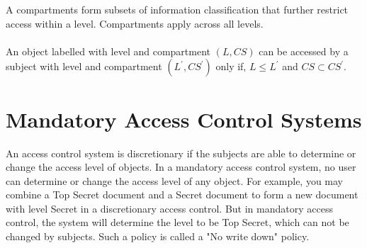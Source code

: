\documentclass[11pt]{article} %
\begin{document}
A compartments form subsets of information classification that further restrict access
within a level. Compartments apply across all levels.\\
\\
An object labelled with level and compartment $(L, CS)$ can be accessed by a subject
with level and compartment $(L^{\prime}, CS^{\prime})$ only if,  $L \leq L^{\prime}$ and
$CS \subset CS^{\prime}$.

\section{Mandatory Access Control Systems}
An access control system is discretionary if the subjects are able to determine or change
the access level of objects. In a mandatory access control system, no user can determine
or change the access level of any object. For example, you may combine a Top Secret document
and a Secret document to form a new document with level Secret in a discretionary access
control. But in mandatory access control, the system will determine the level to be
Top Secret, which can not be changed by subjects. Such a policy is called  a "No write
down" policy.
\end{document}
